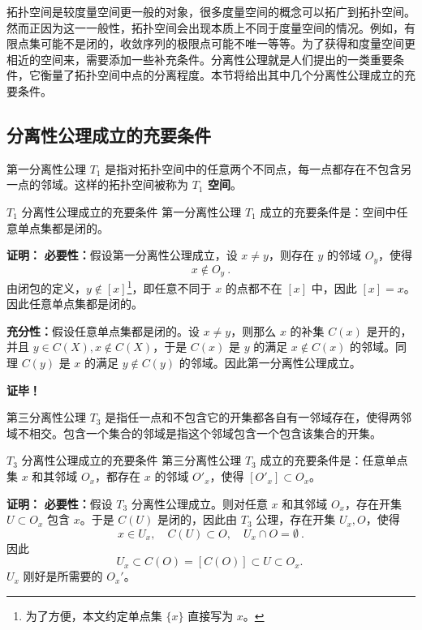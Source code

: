 
拓扑空间是较度量空间更一般的对象，很多度量空间的概念可以拓广到拓扑空间。然而正因为这一一般性，拓扑空间会出现本质上不同于度量空间的情况。例如，有限点集可能不是闭的，收敛序列的极限点可能不唯一等等。为了获得和度量空间更相近的空间来，需要添加一些补充条件。分离性公理就是人们提出的一类重要条件，它衡量了拓扑空间中点的分离程度。本节将给出其中几个分离性公理成立的充要条件。

\subsection{分离性公理成立的充要条件}
第一分离性公理 $T_1$ 是指对拓扑空间中的任意两个不同点，每一点都存在不包含另一点的邻域。这样的拓扑空间被称为\textbf{ $T_1$ 空间}。
\begin{theorem}{$T_1$ 分离性公理成立的充要条件}
第一分离性公理 $T_1$ 成立的充要条件是：空间中任意单点集都是闭的。
\end{theorem}
\textbf{证明：}
\textbf{必要性：}假设第一分离性公理成立，设 $x\neq y$，则存在 $y$ 的邻域 $O_y$，使得
\begin{equation}
x\notin O_y~.
\end{equation}
由闭包的定义，$y\notin [x]$\footnote{为了方便，本文约定单点集 $\{x\}$ 直接写为 $x$。}，即任意不同于 $x$ 的点都不在 $[x]$ 中，因此 $[x]=x$。因此任意单点集都是闭的。

\textbf{充分性：}假设任意单点集都是闭的。设 $x\neq y$，则那么 $x$ 的补集 $C(x)$ 是开的，并且 $y\in C(X),x\notin C(X)$，于是 $C(x)$ 是 $y$ 的满足 $x\notin C(x)$ 的邻域。同理 $C(y)$ 是 $x$ 的满足 $y\notin C(y)$ 的邻域。因此第一分离性公理成立。

\textbf{证毕！}



第三分离性公理 $T_3$ 是指任一点和不包含它的开集都各自有一邻域存在，使得两邻域不相交。包含一个集合的邻域是指这个邻域包含一个包含该集合的开集。


\begin{theorem}{$T_3$ 分离性公理成立的充要条件}
第三分离性公理 $T_3$ 成立的充要条件是：任意单点集 $x$ 和其邻域 $O_x$，都存在 $x$ 的邻域 $ O'_x$，使得 $[O'_x]\subset O_x$。
\end{theorem}

\textbf{证明：}
\textbf{必要性：}假设 $T_3$ 分离性公理成立。则对任意 $x$ 和其邻域 $O_x$，存在开集 $U\subset O_x$ 包含 $x$。于是 $C(U)$ 是闭的，因此由 $T_3$ 公理，存在开集 $U_x, O$，使得
\begin{equation}
x\in U_x,\quad C(U)\subset O,\quad U_x\cap O=\emptyset~.
\end{equation}
因此
\begin{equation}
U_x\subset C(O)=[C(O)]\subset U\subset O_x.~
\end{equation}
$U_x$ 刚好是所需要的 $O_x'$。

